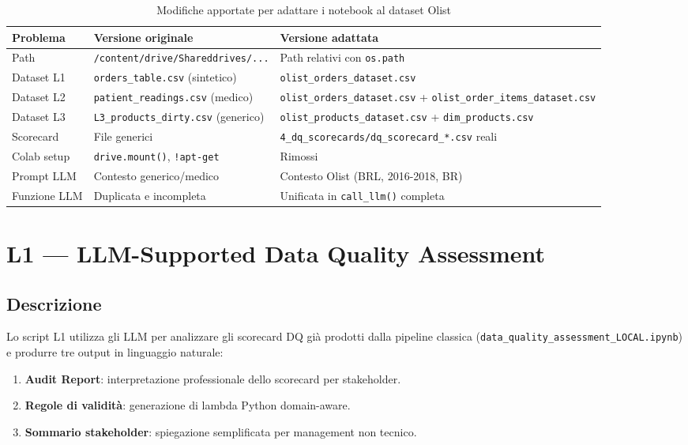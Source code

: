 \documentclass[12pt,a4paper]{article}
\begin{document}
\begin{table}[H]
  \centering
  \begin{tabular}{p{4cm}p{5cm}p{5cm}}
    \toprule
    \textbf{Problema} & \textbf{Versione originale} & \textbf{Versione adattata} \\
    \midrule
    Path & \texttt{/content/drive/Shareddrives/...} & Path relativi con \texttt{os.path} \\
    Dataset L1 & \texttt{orders\_table.csv} (sintetico) & \texttt{olist\_orders\_dataset.csv} \\
    Dataset L2 & \texttt{patient\_readings.csv} (medico) & \texttt{olist\_orders\_dataset.csv} + \texttt{olist\_order\_items\_dataset.csv} \\
    Dataset L3 & \texttt{L3\_products\_dirty.csv} (generico) & \texttt{olist\_products\_dataset.csv} + \texttt{dim\_products.csv} \\
    Scorecard & File generici & \texttt{4\_dq\_scorecards/dq\_scorecard\_*.csv} reali \\
    Colab setup & \texttt{drive.mount()}, \texttt{!apt-get} & Rimossi \\
    Prompt LLM & Contesto generico/medico & Contesto Olist (BRL, 2016-2018, BR) \\
    Funzione LLM & Duplicata e incompleta & Unificata in \texttt{call\_llm()} completa \\
    \bottomrule
  \end{tabular}
  \caption{Modifiche apportate per adattare i notebook al dataset Olist}
\end{table}

\section{L1 — LLM-Supported Data Quality Assessment}

\subsection{Descrizione}

Lo script L1 utilizza gli LLM per analizzare gli scorecard DQ già prodotti
dalla pipeline classica (\texttt{data\_quality\_assessment\_LOCAL.ipynb}) e
produrre tre output in linguaggio naturale:

\begin{enumerate}
  \item \textbf{Audit Report}: interpretazione professionale dello scorecard per stakeholder.
  \item \textbf{Regole di validità}: generazione di lambda Python domain-aware.
  \item \textbf{Sommario stakeholder}: spiegazione semplificata per management non tecnico.
\end{enumerate}
\end{document}

